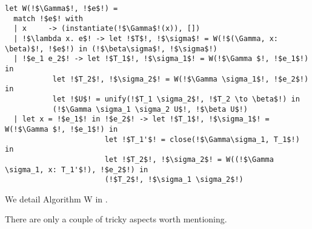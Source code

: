 {\begin{code}[Algorithm W]
\label{code:algorithm-w}
\begin{lstlisting}[style=pseudocode]
let W(!$\Gamma$!, !$e$!) = 
  match !$e$! with
  | x     -> (instantiate(!$\Gamma$!(x)), [])
  | !$\lambda x. e$! -> let !$T$!, !$\sigma$! = W(!$(\Gamma, x: \beta)$!, !$e$!) in (!$\beta\sigma$!, !$\sigma$!)
  | !$e_1 e_2$! -> let !$T_1$!, !$\sigma_1$! = W(!$\Gamma $!, !$e_1$!) in 
           let !$T_2$!, !$\sigma_2$! = W(!$\Gamma \sigma_1$!, !$e_2$!) in 
           let !$U$! = unify(!$T_1 \sigma_2$!, !$T_2 \to \beta$!) in
           (!$\Gamma \sigma_1 \sigma_2 U$!, !$\beta U$!)
  | let x = !$e_1$! in !$e_2$! -> let !$T_1$!, !$\sigma_1$! = W(!$\Gamma $!, !$e_1$!) in
                       let !$T_1'$! = close(!$\Gamma\sigma_1, T_1$!) in
                       let !$T_2$!, !$\sigma_2$! = W((!$\Gamma \sigma_1, x: T_1'$!), !$e_2$!) in
                       (!$T_2$!, !$\sigma_1 \sigma_2$!)
\end{lstlisting}
\vspace{1mm}
\end{code}

We detail Algorithm W in . 

There are only a couple of tricky aspects worth mentioning. 

}

